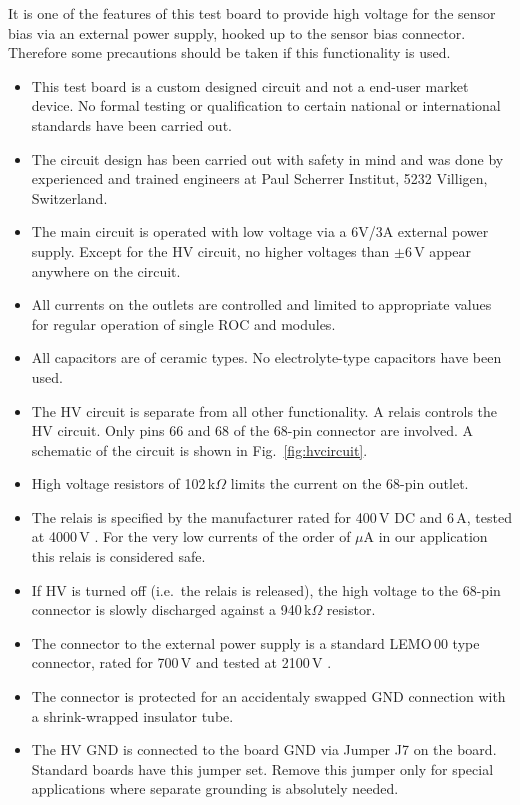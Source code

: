 It is one of the features of this test board to provide high voltage for the sensor bias via an external power supply, hooked up to the sensor bias connector. Therefore some precautions should be taken if this functionality is used.
\begin{itemize}
    \item This test board is a custom designed circuit and not a end-user market device. No formal testing or qualification to certain national or international standards have been carried out.
    \item The circuit design has been carried out with safety in mind and was done by experienced and trained engineers at Paul Scherrer Institut, 5232 Villigen, Switzerland.
    \item The main circuit is operated with low voltage via a 6V/3A external power supply. Except for the HV circuit, no higher voltages than $\pm$6\,V appear anywhere on the circuit.
    \item All currents on the outlets are controlled and limited to appropriate values for regular operation of single ROC and modules.
    \item All capacitors are of ceramic types. No electrolyte-type capacitors have been used.
    \item The HV circuit is separate from all other functionality. A relais controls the HV circuit. Only pins 66 and 68 of the 68-pin connector are involved. A schematic of the circuit is shown in Fig.~\ref{fig:hvcircuit}.
    \item High voltage resistors of 102\,k$\Omega$ limits the current on the 68-pin outlet.
    \item The relais is specified by the manufacturer rated for 400\,V DC and 6\,A, tested at 4000\,V \cite{finderRelais}. For the very low currents of the order of $\mu$A in our application this relais is considered safe.
    \item If HV is turned off (i.e.~the relais is released), the high voltage to the 68-pin connector is slowly discharged against a 940\,k$\Omega$ resistor.
    \item The connector to the external power supply is a standard LEMO\,00 type connector, rated for 700\,V and tested at 2100\,V \cite{lemoConnector}.
    \item The connector is protected for an accidentaly swapped GND connection with a shrink-wrapped insulator tube.
    \item The HV GND is connected to the board GND via Jumper J7 on the board. Standard boards have this jumper set. Remove this jumper only for special applications where separate grounding is absolutely needed.

\end{itemize}
